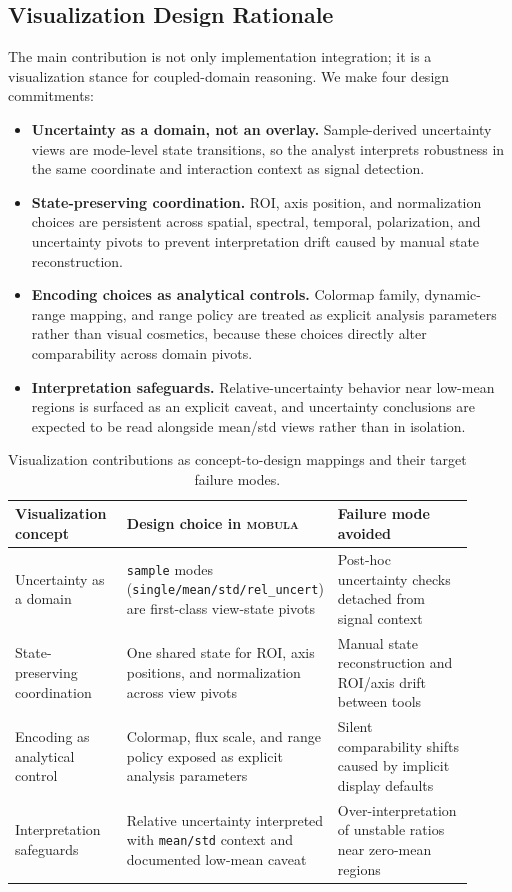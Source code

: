 \documentclass[11pt]{article}
\newcommand{\tool}{\textsc{mobula}}
\begin{document}
\subsection{Visualization Design Rationale}
The main contribution is not only implementation integration; it is a visualization stance for coupled-domain reasoning. We make four design commitments:
\begin{itemize}[leftmargin=1.5em]
  \item \textbf{Uncertainty as a domain, not an overlay.} Sample-derived uncertainty views are mode-level state transitions, so the analyst interprets robustness in the same coordinate and interaction context as signal detection.
  \item \textbf{State-preserving coordination.} ROI, axis position, and normalization choices are persistent across spatial, spectral, temporal, polarization, and uncertainty pivots to prevent interpretation drift caused by manual state reconstruction.
  \item \textbf{Encoding choices as analytical controls.} Colormap family, dynamic-range mapping, and range policy are treated as explicit analysis parameters rather than visual cosmetics, because these choices directly alter comparability across domain pivots.
  \item \textbf{Interpretation safeguards.} Relative-uncertainty behavior near low-mean regions is surfaced as an explicit caveat, and uncertainty conclusions are expected to be read alongside mean/std views rather than in isolation.
\end{itemize}

\begin{table}[t]
  \centering
  \small
  \begin{tabular}{p{0.25\linewidth}p{0.33\linewidth}p{0.33\linewidth}}
    \toprule
    Visualization concept & Design choice in \tool & Failure mode avoided \\
    \midrule
    Uncertainty as a domain & \texttt{sample} modes (\texttt{single/mean/std/rel\_uncert}) are first-class view-state pivots & Post-hoc uncertainty checks detached from signal context \\
    State-preserving coordination & One shared state for ROI, axis positions, and normalization across view pivots & Manual state reconstruction and ROI/axis drift between tools \\
    Encoding as analytical control & Colormap, flux scale, and range policy exposed as explicit analysis parameters & Silent comparability shifts caused by implicit display defaults \\
    Interpretation safeguards & Relative uncertainty interpreted with \texttt{mean/std} context and documented low-mean caveat & Over-interpretation of unstable ratios near zero-mean regions \\
    \bottomrule
  \end{tabular}
  \caption{Visualization contributions as concept-to-design mappings and their target failure modes.}
  \label{tab:viz-contrib}
\end{table}
\end{document}
